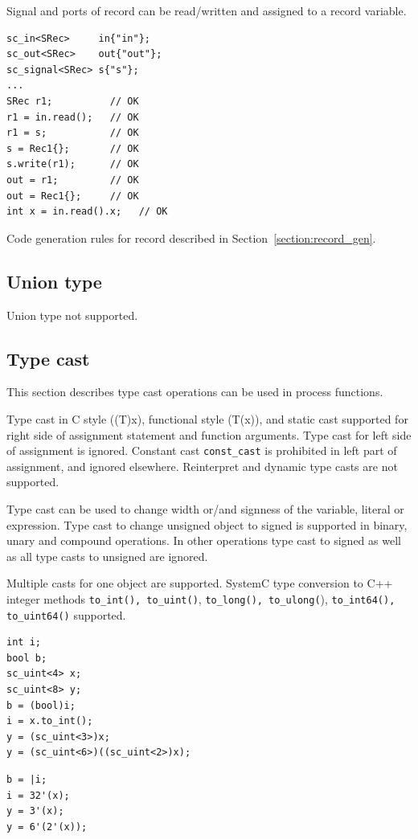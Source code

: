 Signal and ports of record can be read/written and assigned to a record variable.
\begin{lstlisting}[style=mycpp]
sc_in<SRec>     in{"in"};
sc_out<SRec>    out{"out"};
sc_signal<SRec> s{"s"};
...
SRec r1;          // OK
r1 = in.read();   // OK
r1 = s;           // OK
s = Rec1{};       // OK
s.write(r1);      // OK
out = r1;         // OK
out = Rec1{};     // OK
int x = in.read().x;   // OK
\end{lstlisting}
 
Code generation rules for record described in Section~\ref{section:record_gen}. 


\subsection{Union type}

Union type not supported.

\subsection{Type cast}

This section describes type cast operations can be used in process functions. 

Type cast in C style ((T)x), functional style (T(x)), and static cast supported for right side of assignment statement and function arguments. Type cast for left side of assignment is ignored. 
Constant cast {\tt const\_cast} is prohibited in left part of assignment, and ignored elsewhere. Reinterpret and dynamic type casts are not supported.

Type cast can be used to change width or/and signness of the variable, literal or expression. 
Type cast to change unsigned object to signed is supported in binary, unary and compound operations. In other operations type cast to signed as well as all type casts to unsigned are ignored. 

Multiple casts for one object are supported. 
SystemC type conversion to C++ integer methods {\tt to\_int(), to\_uint()}, {\tt to\_long(), to\_ulong(}), {\tt to\_int64(), to\_uint64()} supported. 
%
\begin{lstlisting}[style=mycpp]
int i;
bool b;
sc_uint<4> x;
sc_uint<8> y;
b = (bool)i; 
i = x.to_int();
y = (sc_uint<3>)x;
y = (sc_uint<6>)((sc_uint<2>)x);
\end{lstlisting}
%
\begin{lstlisting}[style=myverilog]
b = |i;
i = 32'(x);
y = 3'(x);
y = 6'(2'(x));
\end{lstlisting}

